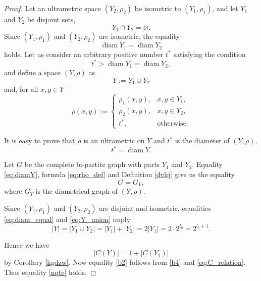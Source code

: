 \documentclass[pdflatex,sn-mathphys-num]{sn-jnl}%
\theoremstyle{thmstyleone}%
\theoremstyle{thmstyletwo}%
\theoremstyle{thmstylethree}%
\theoremstyle{thmstyletwo}%
\theoremstyle{thmstylethree}%
\begin{document}
\begin{proof}
Let an ultrametric space $(Y_2,\rho_2)$ be isometric to $(Y_1,\rho_1)$, and let $Y_1$ and $Y_2$ be disjoint sets,
\begin{equation*}
Y_1 \cap Y_2 = \varnothing.
\end{equation*}
Since $(Y_1,\rho_1)$ and $(Y_2,\rho_2)$ are isometric, the equality
\begin{equation}\label{eq:diam_equal}
\operatorname{diam} Y_1 = \operatorname{diam} Y_2
\end{equation}
holds.
Let us consider an arbitrary positive number $t^*$ satisfying the condition
\begin{equation*}
t^* > \operatorname{diam} Y_1 = \operatorname{diam} Y_2,
\end{equation*}
and
define a space $(Y,\rho)$ as
\begin{equation}\label{eq:Y_union}
Y := Y_1 \cup Y_2
\end{equation}
and, for all $x,y \in Y$
\begin{equation}\label{eq:rho_def}
\rho(x,y) :=
\begin{cases}
\rho_1(x,y), & x,y \in Y_1,\\
\rho_2(x,y), & x,y \in Y_2,\\
t^*, & \text{otherwise}.
\end{cases}
\end{equation}

It is easy to prove that $\rho$ is an ultrametric on $Y$ and $t^*$ is the diameter of $(Y,\rho)$,
\begin{equation}\label{eq:diamY}
t^*=\operatorname{diam}Y.
\end{equation}

Let $G$ be the complete bi-partite graph with parts $Y_1$ and $Y_2$. 
Equality \eqref{eq:diamY}, formula \eqref{eq:rho_def} and Definition \ref{dvhj} give us the equality
\[
G=G_Y,
\]
where $G_Y$ is the diametrical graph of $(Y,\rho)$.


Since $(Y_1,\rho_1)$ and $(Y_2,\rho_2)$ are disjoint and isometric, equalities \eqref{eq:diam_equal} and \eqref{eq:Y_union} imply 
\begin{equation}\label{eq:cardinality}
|Y| = |Y_1 \cup Y_2| = |Y_1| + |Y_2| = 2|Y_1|=2\cdot 2^{l_0}=2^{l_0+1}.
\end{equation}

Hence we have
\begin{equation}\label{eq:C_relation}
|C(Y)| = 1 + |C(Y_1)|
\end{equation}
by Corollary \ref{kgdzw}. Now equality \eqref{b2}
follows from \eqref{b4} and \eqref{eq:C_relation}. Thus equality \eqref{nqte} holds.




\end{proof}
\end{document}
